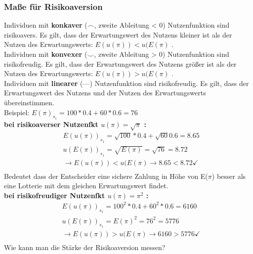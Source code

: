 \documentclass[11pt]{article}
\begin{document}
\subsubsection{Maße für Risikoaversion}
\label{sec:org30da9c4}
Individuen mit \textbf{konkaver} (\(\frown\), zweite Ableitung < 0) Nutzenfunktion sind risikoavers. Es gilt, dass der Erwartungswert des Nutzens kleiner ist als der Nutzen des Erwartungswerts: \(E(u(\pi)) < u(E(\pi)\) .\\
Individuen mit \textbf{konvexer} (\(\smile\), zweite Ableitung > 0) Nutzenfunktion sind risikofreudig. Es gilt, dass der Erwartungswert des Nutzens größer ist als der Nutzen des Erwartungswerts: \(E(u(\pi)) > u(E(\pi)\) .\\
Individuen mit \textbf{linearer} (---) Nutzenfunktion sind risikofreudig. Es gilt, dass der Erwartungswert des Nutzens und der Nutzen des Erwartungswerts übereinstimmen.\\
Beispiel:
\(E(\pi)_{s_1} = 100 *0.4 + 60 * 0.6 = 76\) \\
\textbf{bei risikoaverser Nutzenfkt \(u(\pi)=\sqrt{\pi}\) :}\\
\begin{equation*}
\begin{aligned}
&E(u(\pi))_{s_1} = \sqrt{100} * 0.4 + \sqrt{60} 0.6 = 8.65 \\
&u(E(\pi))_{s_1}= \sqrt{E(\pi)} = \sqrt{76} =8.72 \\
&\rightarrow E(u(\pi)) < u(E(\pi) \rightarrow 8.65 < 8.72 \checkmark\\
\end{aligned}
\end{equation*}
Bedeutet dass der Entscheider eine sichere Zahlung in Höhe von E(\(\pi\)) besser als eine Lotterie mit dem gleichen Erwartungswert findet.\\
\newline
\textbf{bei risikofreudiger Nutzenfkt \(u(\pi)=\pi^2\) :} \\
\begin{equation*}
\begin{aligned}
&E(u(\pi))_{s_1} = 100^2 * 0.4 + 60^2 * 0.6 = 6160 \\
&u(E(\pi))_{s_1}= {E(\pi)}^2 = {76}^2 =5776 \\
&\rightarrow E(u(\pi)) > u(E(\pi) \rightarrow 6160 > 5776 \checkmark\\
\end{aligned}
\end{equation*}
\newline
Wie kann man die Stärke der Risikoaversion messen?
\end{document}
